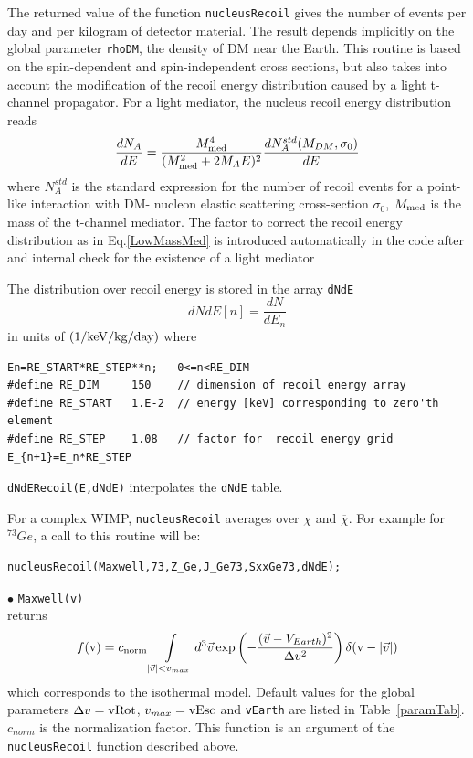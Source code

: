 \documentclass[12pt,a4paper]{article}
\begin{document}
The returned value of the function {\tt nucleusRecoil} gives the number of events per day and per kilogram of 
detector material. The  result depends  implicitly on the  global  parameter \verb|rhoDM|, the
density of DM near the Earth.
This routine is  based on the spin-dependent and spin-independent cross sections, but also
takes into account the modification of the recoil energy distribution caused  by a  light t- channel propagator.
For a light mediator, the nucleus recoil energy distribution  reads
\begin{equation}
\label{LowMassMed}
\frac{dN_{A}}{dE} = \frac{ M_{\rm med}^4}{(M_{\rm med}^2 +2 M_{A} E)^2}
\frac{dN_{A}^{std}(M_{DM},\sigma_0)}{dE} 
\end{equation}
where $N_{A}^{std}$ is the standard expression for the number of recoil events for a point-like interaction with DM- nucleon elastic scattering cross-section $\sigma_0$, $M_{\rm med}$ is the mass of the t-channel mediator. The factor to correct the  recoil energy distribution as in Eq.\ref{LowMassMed}  is introduced automatically in the code after and internal check for  the existence of a light mediator


The distribution over recoil energy is stored in the array 
\verb|dNdE| 
$$
   dNdE[n] = \frac{dN}{dE_n}
$$
in units of ${\rm (1/keV/kg/day)}$ where 
\begin{verbatim}
En=RE_START*RE_STEP**n;   0<=n<RE_DIM
#define RE_DIM     150    // dimension of recoil energy array
#define RE_START   1.E-2  // energy [keV] corresponding to zero'th element 
#define RE_STEP    1.08   // factor for  recoil energy grid  E_{n+1}=E_n*RE_STEP 
\end{verbatim}

\noindent
\verb|dNdERecoil(E,dNdE)| interpolates the {\tt dNdE} table.

For a complex WIMP, \verb|nucleusRecoil| averages over $\chi$ and
$\overline{\chi}$. For example for $^{73}Ge$, a call to this routine will be: 
\begin{verbatim}
nucleusRecoil(Maxwell,73,Z_Ge,J_Ge73,SxxGe73,dNdE);
\end{verbatim}

\noindent
$\bullet$ \verb|Maxwell(v)| \\
returns   
\begin{equation}
f(\mbox{v})= c_{\rm{norm}}\int\limits_{|\vec{v}|<v_{max}} d^3\vec{v} \exp\left(
-\frac{(\vec{v}-V_{Earth})^2}{\Delta v^2}\right)\delta(\mbox{v} -|\vec{v}|)
\label{Maxwell}
\end{equation}
which corresponds to the isothermal model. Default values for the global parameters 
$\Delta v ={\rm vRot}$,  $v_{max}={\rm vEsc}$ and \verb|vEarth| are listed in Table~\ref{paramTab}.
$c_{norm}$ is the normalization factor.  This function is an
argument of the \verb|nucleusRecoil| function described above.
\end{document}
